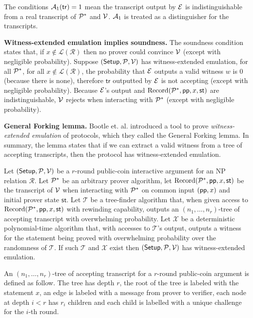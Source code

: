The conditions $\mathcal{A}_1(\mathsf{tr}) = 1$ mean the transcript output by $\mathcal{E}$ is indistinguishable from a real transcript of $\mathcal{P}^*$ and $\mathcal{V}$. $\mathcal{A}_1$ is treated as a distinguisher for the transcripts.

\textbf{Witness-extended emulation implies soundness.} The soundness condition states that, if $x \not\in \mathcal{L(R)}$ then no prover could convince $\mathcal{V}$ (except with negligible probability). Suppose $(\mathsf{Setup}, \mathcal{P}, \mathcal{V})$ has witness-extended emulation, for all $\mathcal{P}^*$, for all $x \not\in \mathcal{L(R)}$, the probability that $\mathcal{E}$ outputs a valid witness $w$ is 0 (because there is none), therefore $\mathsf{tr}$ outputted by $\mathcal{E}$ is not accepting (except with negligible probability). Because $\mathcal{E}$'s output and $\mathrm{Record}(\mathcal{P}^*, \mathsf{pp}, x, \mathsf{st})$ are indistinguishable, $\mathcal{V}$ rejects when interacting with $\mathcal{P}^*$ (except with negligible probability).

\textbf{General Forking lemma.} Bootle et. al. \cite{bootle2016efficient} introduced a tool to prove \textit{witness-extended emulation} of protocols, which they called the General Forking lemma. In summary, the lemma states that if we can extract a valid witness from a tree of accepting transcripts, then the protocol has witness-extended emulation.

\begin{definition}
\label{general-forking}
Let $(\mathsf{Setup}, \mathcal{P}, \mathcal{V})$ be a $r$-round public-coin interactive argument for an NP relation $\mathcal{R}$. Let $\mathcal{P}^*$ be an arbitrary prover algorithm, let $\mathrm{Record}(\mathcal{P}^*, \mathsf{pp}, x, \mathsf{st})$ be the transcript of $\mathcal{V}$ when interacting with $\mathcal{P}^*$ on common input $(\mathsf{pp}, x)$ and initial prover state $\mathsf{st}$. Let $\mathcal{T}$ be a tree-finder algorithm that, when given access to $\mathrm{Record}(\mathcal{P}^*, \mathsf{pp}, x, \mathsf{st})$ with rewinding capability, outputs an $(n_1,\dots,n_r)$-tree of accepting transcript with overwhelming probability. Let $\mathcal{X}$ be a deterministic polynomial-time algorithm that, with accesses to $\mathcal{T}$'s output, outputs a witness for the statement being proved with overwhelming probability over the randomness of $\mathcal{T}$. If such $\mathcal{T}$ and $\mathcal{X}$ exist then $(\mathsf{Setup}, \mathcal{P}, \mathcal{V})$ has witness-extended emulation.

An $(n_1,\dots,n_r)$-tree of accepting transcript for a $r$-round public-coin argument is defined as follow. The tree has depth $r$, the root of the tree is labeled with the statement $x$, an edge is labeled with a message from prover to verifier, each node at depth $i < r$ has $r_i$ children and  each child is labelled with a unique challenge for the $i$-th round.
\end{definition}

